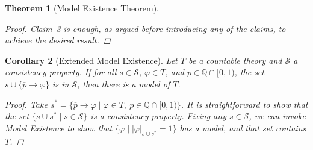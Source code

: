 \documentclass{amsart}
\newtheorem{theorem}{Theorem}[section]
\newtheorem{corollary}[theorem]{Corollary}
\theoremstyle{definition}
\numberwithin{equation}{theorem}
\renewcommand{\phi}{\varphi}
\newcommand{\Q}{\mathbb{Q}}
\newcommand{\where}{\mid}
\newcommand{\rat}[1]{{\overline{#1}}}
\newcommand{\narrow}[1]{\xrightarrow{#1}}
\renewcommand{\to}{\narrow{}}
\begin{document}
\begin{theorem}[Model Existence Theorem]
\begin{proof}
    Claim~3 is enough, as argued before introducing any of the claims, to achieve the desired result.
  \end{proof}
\end{theorem}

\begin{corollary}[Extended Model Existence]
  Let $T$ be a countable theory and $\mathscr{S}$ a consistency property.
  If for all $s\in \mathscr{S}$, $\phi\in T$, and $p\in\Q\cap[0,1)$, the set $s\cup\{\rat p\to \phi\}$ is in $\mathscr{S}$, then there is a model of $T$.
  \begin{proof}
    Take $s^*=\{\rat p\to\phi\where\phi\in T,\ p\in\Q\cap[0,1)\}$.
    It is straightforward to show that the set $\{s\cup s^*\where s\in \mathscr{S}\}$ is a consistency property.
    Fixing any $s\in \mathscr{S}$, we can invoke Model Existence to show that $\{\phi\where |\phi|_{s\cup s^*}=1\}$ has a model, and that set contains $T$.
  \end{proof}
\end{corollary}
\end{document}
